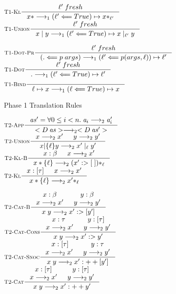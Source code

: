 \begin{figure}
   \begin{subfigure}[t]{1\textwidth}\footnotesize
   \begin{center}
      $\inference
         [\UnlabelledStarBaseTrans]
         {\fresh{\lab'}}
         {x* \translateOne (\lab' \Longleftarrow True) \mapsto x*_{\lab'}}$
      $\inference
         [\UnlabelledUnionTrans]
         {\fresh{\lab'}}
         {x \; | \; y \translateOne (\lab' \Longleftarrow True) \mapsto x \; |_{\lab'} \; y}$

      $\inference
         [\DotWithPredTrans]
         { \fresh{\lab'}}
         {(. \Longleftarrow p \; args) \translateOne (\lab' \Longleftarrow p(args, \lab)) \mapsto \lab'}$
      $\inference
         [\DotNoPredTrans]
         {\fresh{\lab'}}
         {. \translateOne (\lab' \Longleftarrow True) \mapsto \lab'}$
      $\inference
         [\AssignmentNoPredTrans]
         {}
         {\lab \mapsto x \translateOne (\lab \Longleftarrow True) \mapsto x}$

   \end{center}
      \caption{Phase 1 Translation Rules}
      \label{fig:translation-rules-phase1}
   \end{subfigure}
   \begin{subfigure}[t]{1\textwidth}\footnotesize
      \begin{center}
      $\inference
         [\AppTrans]
         {\mathit{as}' = \forall 0 \leq i < n. \; \mathit{a}_i \translate \mathit{a}'_i }
         {<\dc\;\mathit{as}> \translate <\dc\;\mathit{as}'>}$
      $\inference
         [\UnionTrans]
         {x \translate x' & y \translate y'}
         {x |\{\lab\} y \translate x' \; |_{\lab} \; y'}$
      $\inference
         [\StarBaseTrans]
         {\hastype{x}{\base} & x \translate x'}
         {x*\{\lab\} \translate (x' \cons \nil)*_{\lab}}$
      $\inference
         [\StarTrans]
         {\hastype{x}{[\complex]} & x \translate x'}
         {x*\{\lab\} \translate x'*_{\lab}}$
      
      \vspace{0.5em}
      $\inference
         [\ConcatBaseTrans]
         {
            \hastype{x}{\base}
         & \hastype{y}{\base}
         \\ x \translate x'
         & y \translate y'}
         {x \; y \translate x' :> [y']}$
      $\inference
         [\ConcatConsTrans]
         {
            \hastype{x}{\complex}
         & \hastype{y}{[\complex]}
         \\ x \translate x'
         & y \translate y'}
         {x \; y \translate x' :> y'}$
      $\inference
         [\ConcatSnocTrans]
         {
            \hastype{x}{[\complex]}
         & \hastype{y}{\complex}
         \\ x \translate x'
         & y \translate y'}
         {x \; y \translate x' :++ [y']}$
      $\inference
         [\ConcatTrans]
         {
            \hastype{x}{[\complex]}
         & \hastype{y}{[\complex]}
         \\ x \translate x'
         & y \translate y'}
         {x \; y \translate x' :++ y'}$


\end{center}
\end{subfigure}
\end{figure}
